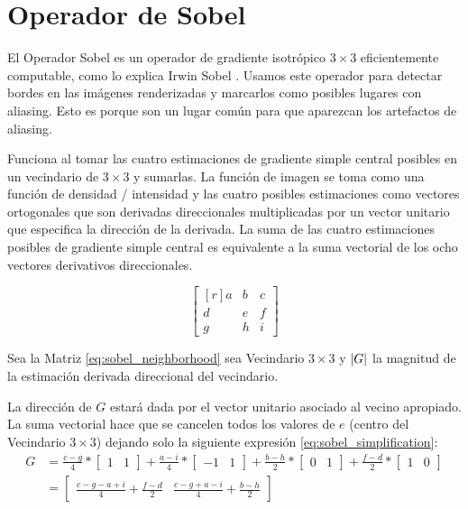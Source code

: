 \documentclass{cslthse-msc}
\DeclarePairedDelimiter\abs{\lvert}{\rvert}%
\begin{document}
\section{Operador de Sobel}
El Operador Sobel es un operador de gradiente isotrópico $3\times 3$ eficientemente computable, como lo explica Irwin Sobel \cite{Sobel2014}. Usamos este operador para detectar bordes en las imágenes renderizadas y marcarlos como posibles lugares con aliasing. Esto es porque son un lugar común para que aparezcan los artefactos de aliasing. 

Funciona al tomar las cuatro estimaciones de gradiente simple central posibles en un vecindario de $3\times 3$ y sumarlas. La función de imagen se toma como una función de densidad / intensidad y las cuatro posibles estimaciones como vectores ortogonales que son derivadas direccionales multiplicadas por un vector unitario que especifica la dirección de la derivada. La suma de las cuatro estimaciones posibles de gradiente simple central es equivalente a la suma vectorial de los ocho vectores derivativos direccionales.

\begin{equation}
\begin{bmatrix*}[r]\label{eq:sobel_neighborhood}
a & b & c \\
d & e & f \\
g & h & i
\end{bmatrix*}
\end{equation}

Sea la Matriz \ref{eq:sobel_neighborhood} sea Vecindario $3\times 3$ y $\abs*{G}$ la magnitud de la estimación derivada direccional del vecindario.

La dirección de $G$ estará dada por el vector unitario asociado al vecino apropiado. La suma vectorial hace que se cancelen todos los valores de $e$ (centro del  Vecindario $3\times 3$) dejando solo la siguiente expresión \ref{eq:sobel_simplification}:
\begin{equation}\label{eq:sobel_simplification}
\begin{split}
	G & =\frac{c-g}{4}*\begin{bmatrix*}1 & 1\end{bmatrix*}+\frac{a-i}{4}*\begin{bmatrix*}-1 & 1\end{bmatrix*}+\frac{b-h}{2}*\begin{bmatrix*}0 & 1\end{bmatrix*}+\frac{f-d}{2}*\begin{bmatrix*}1 & 0\end{bmatrix*} \\ & =\begin{bmatrix*}\frac{c-g-a+i}{4}+\frac{f-d}{2} & \frac{c-g+a-i}{4}+\frac{b-h}{2}\end{bmatrix*}
\end{split}
\end{equation}
\end{document}
